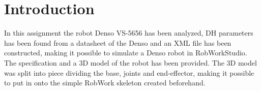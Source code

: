 \section{Introduction}

In this assignment the robot Denso VS-5656 has been analyzed, DH parameters has been found from a datasheet of the Denso and an XML file has been constructed, making it possible to simulate a Denso robot in RobWorkStudio. The specification and a 3D model of the robot has been provided. The 3D model was split into piece dividing the base, joints and end-effector, making it possible to put in onto the simple RobWork skeleton created beforehand.
